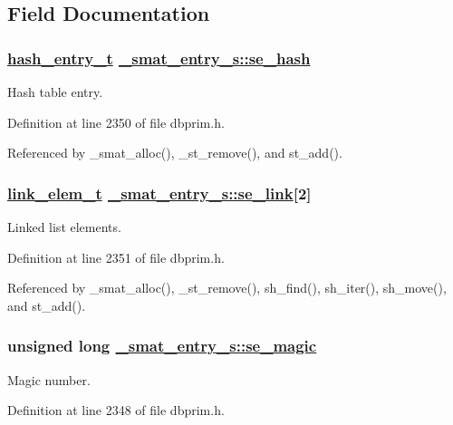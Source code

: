\subsection{Field Documentation}
\hypertarget{struct__smat__entry__s_o2}{
\subsubsection[se\_\-hash]{\setlength{\rightskip}{0pt plus 5cm}\hyperlink{struct__hash__entry__s}{hash\_\-entry\_\-t} \hyperlink{struct__smat__entry__s_o2}{\_\-smat\_\-entry\_\-s::se\_\-hash}}}
\label{struct__smat__entry__s_o2}


Hash table entry. 

Definition at line 2350 of file dbprim.h.

Referenced by \_\-smat\_\-alloc(), \_\-st\_\-remove(), and st\_\-add().\hypertarget{struct__smat__entry__s_o3}{
\subsubsection[se\_\-link]{\setlength{\rightskip}{0pt plus 5cm}\hyperlink{struct__link__elem__s}{link\_\-elem\_\-t} \hyperlink{struct__smat__entry__s_o3}{\_\-smat\_\-entry\_\-s::se\_\-link}\mbox{[}2\mbox{]}}}
\label{struct__smat__entry__s_o3}


Linked list elements. 

Definition at line 2351 of file dbprim.h.

Referenced by \_\-smat\_\-alloc(), \_\-st\_\-remove(), sh\_\-find(), sh\_\-iter(), sh\_\-move(), and st\_\-add().\hypertarget{struct__smat__entry__s_o0}{
\subsubsection[se\_\-magic]{\setlength{\rightskip}{0pt plus 5cm}unsigned long \hyperlink{struct__smat__entry__s_o0}{\_\-smat\_\-entry\_\-s::se\_\-magic}}}
\label{struct__smat__entry__s_o0}


Magic number. 

Definition at line 2348 of file dbprim.h.

